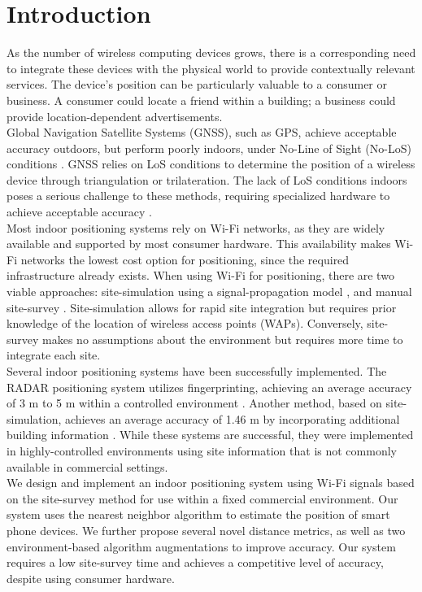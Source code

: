 \documentclass[conference]{IEEEtran}
\begin{document}
\section{Introduction}
As the number of wireless computing devices grows, there is a corresponding need to integrate these devices with the physical world to provide contextually relevant services. The device's position can be particularly valuable to a consumer or business. A consumer could locate a friend within a building; a business could provide location-dependent advertisements.\\
\indent Global Navigation Satellite Systems (GNSS), such as GPS, achieve acceptable accuracy outdoors, but perform poorly indoors, under No-Line of Sight (No-LoS) conditions  \cite{Lakmali}. GNSS relies on LoS conditions to determine the position of a wireless device through triangulation or trilateration. The lack of LoS conditions indoors poses a serious challenge to these methods, requiring specialized hardware to achieve acceptable accuracy \cite{Liu}. \\
\indent Most indoor positioning systems rely on Wi-Fi networks, as they are widely available and supported by most consumer hardware. This availability makes Wi-Fi networks the lowest cost option for positioning, since the required infrastructure already exists. When using Wi-Fi for positioning, there are two viable approaches: site-simulation using a signal-propagation model \cite{Kokkinis}, and manual site-survey \cite{Chaudhuri}. Site-simulation allows for rapid site integration but requires prior knowledge of the location of wireless access points (WAPs). Conversely, site-survey makes no assumptions about the environment but requires more time to integrate each site. \\
\indent Several indoor positioning systems have been successfully implemented. The RADAR positioning system utilizes fingerprinting, achieving an average accuracy of 3 m to 5 m within a controlled environment \cite{Bahl}. Another method, based on site-simulation, achieves an average accuracy of 1.46 m by incorporating additional building information \cite{Kokkinis}. While these systems are successful, they were implemented in highly-controlled environments using site information that is not commonly available in commercial settings.\\
\indent We design and implement an indoor positioning system using Wi-Fi signals based on the site-survey method for use within a fixed commercial environment. Our system uses the nearest neighbor algorithm to estimate the position of smart phone devices. We further propose several novel distance metrics, as well as two environment-based algorithm augmentations to improve accuracy. Our system requires a low site-survey time and achieves a competitive level of accuracy, despite using consumer hardware.\\
\end{document}
